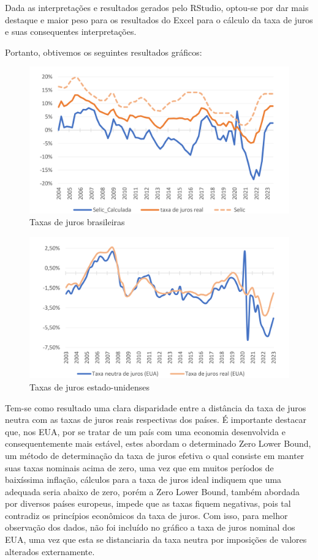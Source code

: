 Dada as interpreta\c{c}\~{o}es e resultados gerados pelo RStudio, optou-se por dar mais destaque e maior peso para os resultados do Excel para o c\'{a}lculo da taxa de juros e suas consequentes interpreta\c{c}\~{o}es. 

 Portanto, obtivemos os seguintes resultados gr\'{a}ficos: 

 \begin{figure}
    \centering
    \caption{Taxas de juros brasileiras}
    \includegraphics[width = .9\linewidth]{relatorios/macro/imagens/grafico4}
\end{figure}

\begin{figure}
    \centering
    \caption{Taxas de juros estado-unidenses}
    \includegraphics[width = .9\linewidth]{relatorios/macro/imagens/grafico5}
\end{figure}

Tem-se como resultado uma clara disparidade entre a dist\^{a}ncia da taxa de juros neutra com as taxas de juros reais respectivas dos pa\'{i}ses. \'{E} importante destacar que, nos EUA, por se tratar de um pa\'{i}s com uma economia desenvolvida e consequentemente mais est\'{a}vel, estes abordam o determinado Zero Lower Bound, um m\'{e}todo de determina\c{c}\~{a}o da taxa de juros efetiva o qual consiste em manter suas taxas nominais acima de zero, uma vez que em muitos per\'{i}odos de baix\'{i}ssima infla\c{c}\~{a}o, c\'{a}lculos para a taxa de juros ideal indiquem que uma adequada seria abaixo de zero, por\'{e}m a Zero Lower Bound, tamb\'{e}m abordada por diversos pa\'{i}ses europeus, impede que as taxas fiquem negativas, pois tal contradiz os princ\'{i}pios econ\^{o}micos da taxa de juros. Com isso, para melhor observa\c{c}\~{a}o dos dados, n\~{a}o foi inclu\'{i}do no gr\'{a}fico a taxa de juros nominal dos EUA, uma vez que esta se distanciaria da taxa neutra por imposi\c{c}\~{o}es de valores alterados externamente. 

